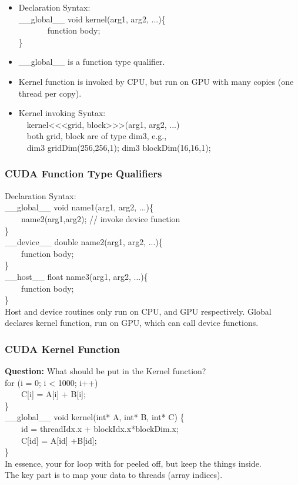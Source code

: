 \documentclass[xcolor={x11names,svgnames,dvipsnames}]{beamer}
\begin{document}
\begin{frame}
\begin{itemize}
\item Declaration Syntax:\\
\_\_global\_\_ void kernel(arg1, arg2, ...)\{\\
\ \ \ \ \ \ \  function body;\\
\}
\item  \_\_global\_\_ is a function type qualifier.
\item Kernel function is invoked by CPU, but run on GPU with
many copies (one thread per copy).
\item Kernel invoking Syntax:\\
\ \ kernel<<<grid, block>>>(arg1, arg2, ...)\\
\ \ both grid, block are of type dim3, e.g.,\\
\ \ dim3 gridDim(256,256,1); dim3 blockDim(16,16,1);\\
\end{itemize}
\end{frame}

\begin{frame}
\frametitle{CUDA Function Type Qualifiers}
Declaration Syntax:\\
\_\_global\_\_ void name1(arg1, arg2, ...)\{\\
\ \ \ \ name2(arg1,arg2); // invoke device function\\
\}\\
\_\_device\_\_ double name2(arg1, arg2, ...)\{\\
\ \ \ \ function body;\\
\}\\
\_\_host\_\_ float name3(arg1, arg2, ...)\{\\
\ \ \ \ function body;\\
\}\\
Host and device routines only run on CPU, and GPU respectively.
Global declares kernel function, run on GPU, which can call device
functions.

\end{frame}

\begin{frame}
\frametitle{CUDA Kernel Function}

\textbf{Question:} What should be put in the Kernel function?\\
for (i = 0; i < 1000; i++)\\
\ \ \ \ C[i] = A[i] + B[i];\\
\}\\

\_\_global\_\_ void kernel(int* A, int* B, int* C) \{\\
\ \ \ \ id = threadIdx.x + blockIdx.x*blockDim.x;\\
\ \ \ \ C[id] = A[id] +B[id];\\
\}\\
In essence, your for loop with for peeled off, but keep the
things inside.\\
The key part is to map your data to threads (array indices).

\end{frame}
\end{document}
